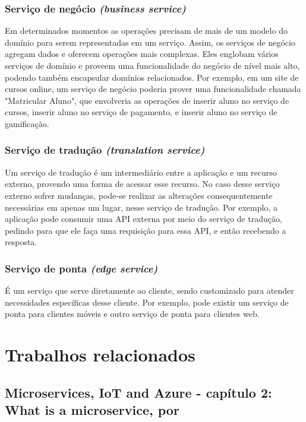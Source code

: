 \subsubsection{Serviço de negócio \emph{(business service)}}
Em determinados momentos as operações precisam de mais de um modelo do domínio para serem representadas em um serviço. Assim, os serviços de negócio agregam dados e oferecem operações mais complexas. Eles englobam vários serviços de domínio e proveem uma funcionalidade do negócio de nível mais alto, podendo também encapsular domínios relacionados. Por exemplo, em um site de cursos online, um serviço de negócio poderia prover uma funcionalidade chamada "Matricular Aluno", que envolveria as operações de inserir aluno no serviço de cursos, inserir aluno no serviço de pagamento, e inserir aluno no serviço de gamificação.

\subsubsection{Serviço de tradução \emph{(translation service)}}
Um serviço de tradução é um intermediário entre a aplicação e um recurso externo, provendo uma forma de acessar esse recurso. No caso desse serviço externo sofrer mudanças, pode-se realizar as alterações consequentemente necessárias em apenas um lugar, nesse serviço de tradução. Por exemplo, a aplicação pode consumir uma API externa por meio do serviço de tradução, pedindo para que ele faça uma requisição para essa API, e então recebendo a resposta. %

\subsubsection{Serviço de ponta \emph{(edge service)}}
É um serviço que serve diretamente ao cliente, sendo customizado para atender necessidades específicas desse cliente. Por exemplo, pode existir um serviço de ponta para clientes móveis e outro serviço de ponta para clientes web.

\section{Trabalhos relacionados}

\subsection{Microservices, IoT and Azure - capítulo 2: What is a microservice, por }

